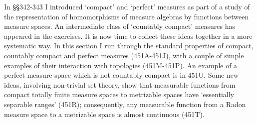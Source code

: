 
\def\undphi{\underline{\phi}\vthsp}

\def\chaptername{Perfect measures, disintegrations and processes}
\def\sectionname{Perfect, compact and countably compact measures}


In \S\S342-343 I introduced `compact' and `perfect' measures as part of
a study of the representation of homomorphisms of measure algebras by
functions between measure spaces.   An intermediate class of `countably
compact' measures has appeared in the exercises.   It is now time to collect these
ideas together in a more systematic way.   In this section I run through
the standard properties of compact, countably compact and perfect
measures (451A-451J), with a couple of simple examples of their
interaction with topologies (451M-451P).   An example of a
perfect measure space which is not countably compact is in 451U.   Some
new ideas, involving non-trivial set theory, show that measurable
functions from compact totally finite measure spaces to metrizable
spaces have `essentially separable ranges' (451R);  consequently, any
measurable function from a Radon measure space to a metrizable space is
almost continuous (451T).

